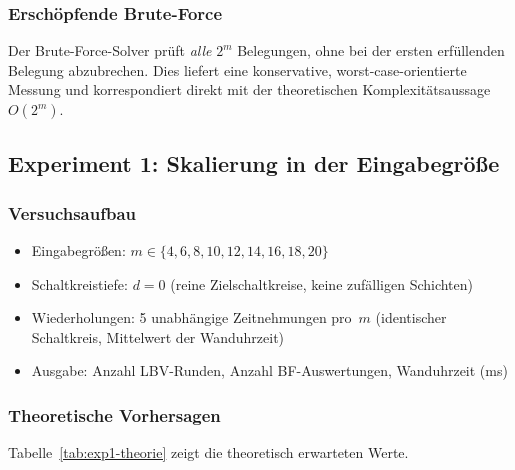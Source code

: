 ﻿\documentclass[a4paper,12pt]{article}
\theoremstyle{definition}
\begin{document}
\subsubsection{Erschöpfende Brute-Force}

Der Brute-Force-Solver prüft \emph{alle} $2^m$ Belegungen, ohne bei der ersten
erfüllenden Belegung abzubrechen.  Dies liefert eine konservative, worst-case-orientierte
Messung und korrespondiert direkt mit der theoretischen Komplexitätsaussage $O(2^m)$.

\subsection{Experiment 1: Skalierung in der Eingabegröße}
\label{subsec:exp1}

\subsubsection{Versuchsaufbau}

\begin{itemize}
  \item Eingabegrößen: $m \in \{4, 6, 8, 10, 12, 14, 16, 18, 20\}$
  \item Schaltkreistiefe: $d = 0$ (reine Zielschaltkreise, keine zufälligen Schichten)
  \item Wiederholungen: 5 unabhängige Zeitnehmungen pro~$m$ (identischer Schaltkreis,
    Mittelwert der Wanduhrzeit)
  \item Ausgabe: Anzahl LBV-Runden, Anzahl BF-Auswertungen, Wanduhrzeit (ms)
\end{itemize}

\subsubsection{Theoretische Vorhersagen}

Tabelle~\ref{tab:exp1-theorie} zeigt die theoretisch erwarteten Werte.
\end{document}

